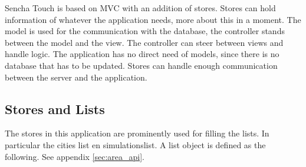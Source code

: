 Sencha Touch is based on MVC with an addition of stores. Stores can hold information of whatever the application needs, more about this in a moment. The model is used for the communication with the database, the controller stands between the model and the view. The controller can steer between views and handle logic. The application has no direct need of models, since there is no database that has to be updated. Stores can handle enough communication between the server and the application. 

\subsection{Stores and Lists}
The stores in this application are prominently used for filling the lists. In particular the cities list en simulationslist. A list object is defined as the following. See appendix \ref{sec:area_api}.

